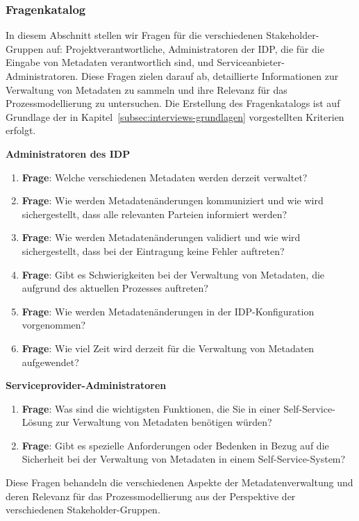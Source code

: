 \documentclass[11pt,a4paper]{scrartcl}
\begin{document}
\subsubsection{Fragenkatalog}
In diesem Abschnitt stellen wir Fragen für die verschiedenen Stakeholder-Gruppen auf: Projektverantwortliche, Administratoren der IDP, die für die Eingabe von Metadaten verantwortlich sind, und Serviceanbieter-Administratoren. 
Diese Fragen zielen darauf ab, detaillierte Informationen zur Verwaltung von Metadaten zu sammeln und ihre Relevanz für das Prozessmodellierung zu untersuchen.
Die Erstellung des Fragenkatalogs ist auf Grundlage der in Kapitel~\ref{subsec:interviews-grundlagen} vorgestellten Kriterien erfolgt.

\textbf{Administratoren des IDP}
\begin{enumerate}
    \item \textbf{Frage}: Welche verschiedenen Metadaten werden derzeit verwaltet?
    \item \textbf{Frage}: Wie werden Metadatenänderungen kommuniziert und wie wird sichergestellt, dass alle relevanten Parteien informiert werden?
    \item \textbf{Frage}: Wie werden Metadatenänderungen validiert und wie wird sichergestellt, dass bei der Eintragung keine Fehler auftreten?
    \item \textbf{Frage}: Gibt es Schwierigkeiten bei der Verwaltung von Metadaten, die aufgrund des aktuellen Prozesses auftreten?
    \item \textbf{Frage}: Wie werden Metadatenänderungen in der IDP-Konfiguration vorgenommen?
    \item \textbf{Frage}: Wie viel Zeit wird derzeit für die Verwaltung von Metadaten aufgewendet?
\end{enumerate}

\textbf{Serviceprovider-Administratoren}
\begin{enumerate}
    \item \textbf{Frage}: Was sind die wichtigsten Funktionen, die Sie in einer Self-Service-Lösung zur Verwaltung von Metadaten benötigen würden?
    \item \textbf{Frage}: Gibt es spezielle Anforderungen oder Bedenken in Bezug auf die Sicherheit bei der Verwaltung von Metadaten in einem Self-Service-System?
\end{enumerate}

Diese Fragen behandeln die verschiedenen Aspekte der Metadatenverwaltung und deren Relevanz für das Prozessmodellierung aus der Perspektive der verschiedenen Stakeholder-Gruppen.
\end{document}
